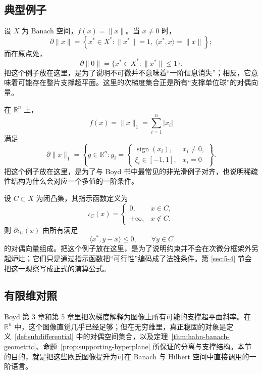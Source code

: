 \subsection{典型例子}

\begin{example}[范数函数的次微分]\label{ex:norm-subdifferential}
设 $X$ 为 Banach 空间，$f(x)=\|x\|$。当 $x\neq 0$ 时，
\[
\partial \|x\|
=
\left\{x^\ast\in X^\ast:\|x^\ast\|=1,\ \langle x^\ast,x\rangle=\|x\|\right\};
\]
而在原点处，
\[
\partial \|0\|=\{x^\ast\in X^\ast:\|x^\ast\|\le 1\}.
\]
把这个例子放在这里，是为了说明不可微并不意味着“一阶信息消失”；相反，它意味着可能存在整片支撑超平面。这里的次梯度集合正是所有“支撑单位球”的对偶向量。
\end{example}

\begin{example}\label{ex:l1-subgradient}
在 $\mathbb R^n$ 上，
\[
f(x)=\|x\|_1=\sum_{i=1}^n |x_i|
\]
满足
\[
\partial \|x\|_1
=
\left\{g\in\mathbb R^n:
g_i=
\begin{cases}
\operatorname{sign}(x_i), & x_i\neq 0,\\
\xi_i\in[-1,1], & x_i=0
\end{cases}
\right\}.
\]
把这个例子放在这里，是为了与 Boyd 书中最常见的非光滑例子对齐，也说明稀疏性结构为什么会对应一个多值的一阶条件。
\end{example}

\begin{example}[指示函数与法锥原型]\label{ex:indicator-normal-cone-preview}
设 $C\subset X$ 为闭凸集，其指示函数定义为
\[
\iota_C(x)=
\begin{cases}
0, & x\in C,\\
+\infty, & x\notin C.
\end{cases}
\]
则 $\partial \iota_C(x)$ 由所有满足
\[
\langle x^\ast,y-x\rangle\le 0,\qquad \forall y\in C
\]
的对偶向量组成。把这个例子放在这里，是为了说明约束并不会在次微分框架外另起炉灶；它们只是通过指示函数把“可行性”编码成了法锥条件。第 \ref{sec:5-4} 节会把这一观察写成正式的演算公式。
\end{example}

\subsection*{有限维对照}

Boyd 第 3 章和第 5 章里把次梯度解释为图像上所有可能的支撑超平面斜率。在 $\mathbb R^n$ 中，这个图像直觉几乎已经足够；但在无穷维里，真正稳固的对象是定义~\ref{def:subdifferential} 中的对偶空间集合，以及定理~\ref{thm:hahn-banach-geometric}、命题~\ref{prop:supporting-hyperplane} 所保证的分离与支撑结构。本节的目的，就是把这些欧氏图像提升为可在 Banach 与 Hilbert 空间中直接调用的一阶语言。


